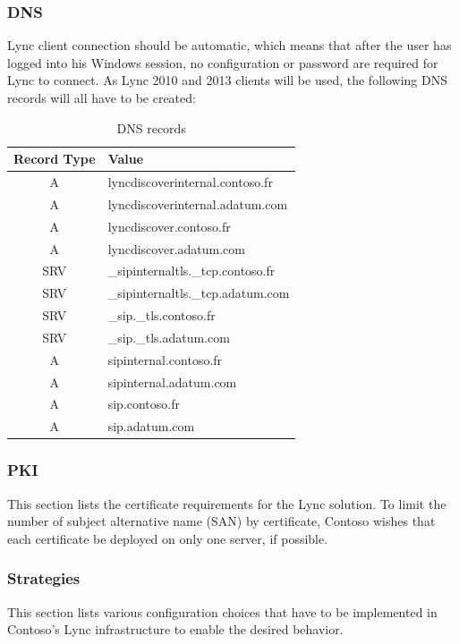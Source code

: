 	\subsubsection{DNS}
	Lync client connection should be automatic, which means that after the user has logged into his Windows session, no configuration or password are required for Lync to connect. As Lync 2010 and 2013 clients will be used, the following DNS records will all have to be created:
	\begin{table}[H]
	\centering
	\begin{tabular}{c|l}
		Record Type & Value \\ \hline 
		A & lyncdiscoverinternal.contoso.fr \\
		A & lyncdiscoverinternal.adatum.com \\
		A & lyncdiscover.contoso.fr \\
		A & lyncdiscover.adatum.com \\
		SRV & \_sipinternaltls.\_tcp.contoso.fr \\
		SRV & \_sipinternaltls.\_tcp.adatum.com \\
		SRV & \_sip.\_tls.contoso.fr \\
		SRV & \_sip.\_tls.adatum.com \\
		A & sipinternal.contoso.fr \\
		A & sipinternal.adatum.com \\
		A & sip.contoso.fr \\ 
		A & sip.adatum.com
	\end{tabular}
	\caption{\label{tab:case_dns} DNS records}
	\end{table}

	
	\subsubsection{PKI}
	This section lists the certificate requirements for the Lync solution. To limit the number of subject alternative name (SAN) by certificate, Contoso wishes that each certificate be deployed on only one server, if possible.
	
	
	\subsubsection{Strategies}
	
		This section lists various configuration choices that have to be implemented in Contoso's Lync infrastructure to enable the desired behavior.
		
